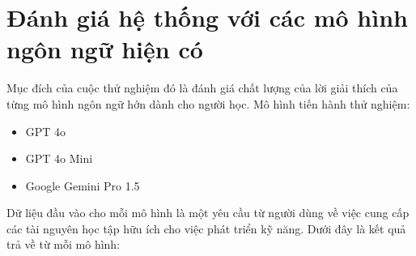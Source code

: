 \section{Đánh giá hệ thống với các mô hình ngôn ngữ hiện có}

Mục đích của cuộc thử nghiệm đó là đánh giá chất lượng của lời giải thích của từng mô hình ngôn ngữ hớn dành cho người học. Mô hình tiến hành thử nghiệm:
\begin{itemize}
    \item GPT 4o
    \item GPT 4o Mini
    \item Google Gemini Pro 1.5
\end{itemize}
Dữ liệu đầu vào cho mỗi mô hình là một yêu cầu từ người dùng về việc cung cấp các tài nguyên học tập hữu ích cho việc phát triển kỹ năng. Dưới đây là kết quả trả về từ mỗi mô hình:
